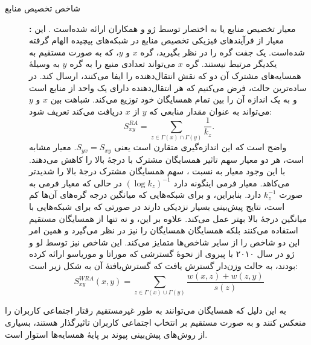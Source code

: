 \begin{description}
\item[شاخص تخصیص منابع ]\textbf{:}
معیار تخصیص منابع یا به اختصار  توسط ژو و همکاران ارائه شده‌است \cite{zhou2009predicting}. این معیار از فرآیندهای فیزیکی تخصیص منابع در شبکه‌های پیچیده الهام گرفته شده‌است. یک جفت گره را در نظر بگیرید، گره $x$ و $y$، که به صورت مستقیم به یکدیگر مرتبط نیستند. گره $x$ می‌تواند تعدادی منبع را به گره $y$ به وسیلهٔ همسایه‌های مشترک آن دو که نقش انتقال‌دهنده را ایفا می‌کنند، ارسال کند. در ساده‌ترین حالت، فرض می‌کنیم که هر انتقال‌دهنده دارای یک واحد از منابع است و به یک اندازه آن را بین تمام همسایگان خود توزیع می‌کند. شباهت بین $x$ و $y$ می‌تواند به عنوان مقدار منابعی که $y$ از $x$ دریافت می‌کند تعریف شود:
\begin{equation}
S_{xy}^{RA}= \sum_{z\in\Gamma(x)\cap\Gamma(y)}{\frac{1}{k_{z}}}.
\end{equation}
واضح است که این اندازه‌گیری متقارن است یعنی $S_{yx} = S_{xy}$. معیار  مشابه  است، هر دو معیار سهم تاثیر همسایگان مشترک با درجهٔ بالا را کاهش می‌دهند. با این وجود معیار  به نسبت ، سهم همسایگان مشترک درجهٔ بالا را شدیدتر می‌کاهد. معیار  فرمی اینگونه دارد $(\log k_{z})^{-1}$ در حالی که معیار  فرمی به صورت $k_{z}^{-1}$ دارد. بنابراین،  و  برای شبکه‌هایی که میانگین درجه گره‌های آن‌ها کم است، نتایج پیش‌بینی بسیار نزدیکی دارند در صورتی که   برای شبکه‌هایی با میانگین درجهٔ بالا بهتر عمل می‌کند. علاوه بر این،  و  نه تنها از همسایگان مستقیم استفاده می‌کنند بلکه همسایگان همسایگان را نیز در نظر می‌گیرد و همین امر این دو شاخص را از سایر شاخص‌ها متمایز می‌کند.
این شاخص نیز توسط لو و ژو در سال ۲۰۱۰ با پیروی از نحوهٔ گسترشی که موراتا و موریاسو ارائه کرده بودند، به حالت وزن‌دار گسترش یافت \cite{lu2010link} که گسترش‌یافتهٔ آن به شکل زیر است:
\begin{equation}
S_{xy}^{WRA}(x,y) = \sum_{z\in\Gamma(x)\cup\Gamma(y)}\frac{w(x,z)+w(z,y)}{s(z)}
\end{equation}

\end{description}
به این دلیل که همسایگان می‌توانند به طور غیرمستقیم رفتار اجتماعی کاربران را منعکس کنند و به صورت مستقیم بر انتخاب اجتماعی کاربران تاثیرگذار هستند، بسیاری از روش‌های پیش‌بینی پیوند بر پایهٔ همسایه‌ها استوار است.

